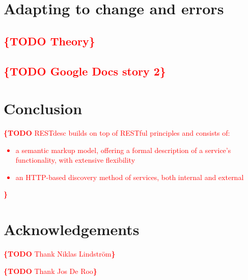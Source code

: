 \documentclass[runningheads,a4paper, twocolumn]{llncs}
\newcommand{\todo}[1]{\noindent\textcolor{red}{{\bf \{TODO} #1{\bf \}}}}
\begin{document}
\section{Adapting to change and errors}
\subsection{\todo{Theory}}
\subsection{\todo{Google Docs story 2}}


\section{Conclusion}

\todo{RESTdesc builds on top of RESTful principles and consists of:
\begin{itemize}
\item a semantic markup model, offering a formal description of a service's functionality, with extensive flexibility
\item an HTTP-based discovery method of services, both internal and external
\end{itemize}
}


\section*{Acknowledgements}
\todo{Thank Niklas Lindstr\"om}

\todo{Thank Jos De Roo}

\renewcommand{\ttdefault}{cmvtt}



\end{document}
